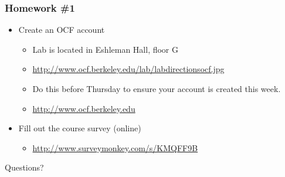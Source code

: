 \documentclass[14pt]{beamer}
\begin{document}
\begin{frame}
	\frametitle{Homework \#1}
	\begin{itemize}
		\item Create an OCF account
		\begin{itemize}
			\item Lab is located in Eshleman Hall, floor G
			\item \url{http://www.ocf.berkeley.edu/lab/labdirectionsocf.jpg}
			\item Do this before Thursday to ensure your account is created this week.
			\item \url{http://www.ocf.berkeley.edu}
		\end{itemize}
		\item Fill out the course survey (online)
		\begin{itemize}
		  \item \url{http://www.surveymonkey.com/s/KMQFF9B}
		\end{itemize}
	\end{itemize}
\end{frame}

\begin{frame}
	Questions?
\end{frame}
\end{document}
